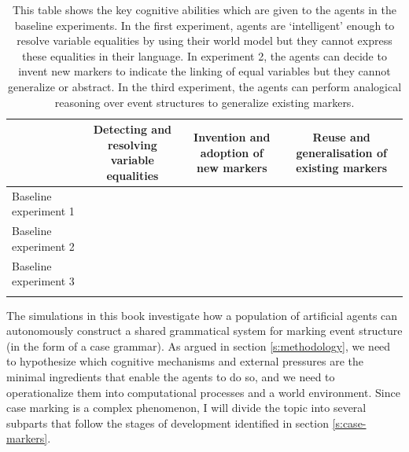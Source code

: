\begin{table}[t]

\begin{tabular}[c]{p{2.5cm}ccc}
 \lsptoprule
 & \parbox{3cm}{\raggedright Detecting and resolving variable equalities} 
	&\parbox{2.5cm}{\raggedright Invention and adoption of new markers}
		&\parbox{3cm}{\raggedright Reuse and generalisation of existing markers} \\
		\midrule
\raggedright Baseline experiment 1 & \raisebox{-.5\height}{$+$}& \raisebox{-.5\height}{$-$} &\raisebox{-.5\height}{$-$} \\
\raggedright Baseline experiment 2 & \raisebox{-.5\height}{$+$}& \raisebox{-.5\height}{$+$} &\raisebox{-.5\height}{$-$} \\
\raggedright Baseline experiment 3 & \raisebox{-.5\height}{$+$} & \raisebox{-.5\height}{$+$} &\raisebox{-.5\height}{$+$}\\
 \lspbottomrule
\end{tabular}



\caption[Key cognitive abilities in the baseline experiments]{This table shows the key cognitive abilities which are given to the agents in the baseline experiments. In the first experiment, agents are `intelligent' enough to resolve variable equalities by using their world model but they cannot express these equalities in their language. In experiment 2, the agents can decide to invent new markers to indicate the linking of equal variables but they cannot generalize or abstract. In the third experiment, the agents can perform analogical reasoning over event structures to generalize existing markers.}
\label{t:repairs}
\end{table}

The simulations in this book investigate how a population of artificial agents can autonomously construct a shared grammatical system for marking event structure (in the form of a case grammar). As argued in section \ref{s:methodology}, we need to hypothesize which cognitive mechanisms and external pressures are the minimal ingredients that enable the agents to do so, and we need to operationalize them into computational processes and a world environment. Since case marking is a complex phenomenon, I will divide the topic into several subparts that follow the stages of development identified in section \ref{s:case-markers}.

